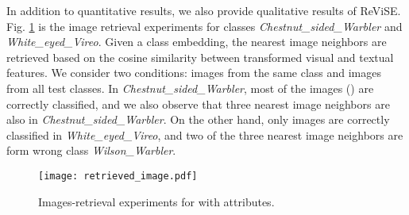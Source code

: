 {{In addition to quantitative results, we also provide qualitative results of ReViSE. Fig. \ref{fig:retr_image} is the image retrieval experiments
for classes {\em Chestnut\_sided\_Warbler} and {\em White\_eyed\_Vireo}. Given a class embedding, the nearest image neighbors are retrieved based on the cosine similarity between transformed visual and textual features. We consider two conditions: images from the same class and images from all test classes. In {\em Chestnut\_sided\_Warbler}, most of the images () are correctly classified, and we also observe that three nearest image neighbors are also in {\em Chestnut\_sided\_Warbler}. On the other hand, only  images are correctly classified in {\em White\_eyed\_Vireo}, and two of the three nearest image neighbors are form wrong class {\em Wilson\_Warbler}.

 



\begin{figure}[t!]
\texttt{[image: retrieved\_image.pdf]}
\caption{\footnotesize Images-retrieval experiments for  with  attributes.}
\label{fig:retr_image}
\vspace{-0.1in}
\end{figure}



}}
